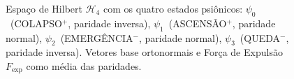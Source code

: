 \documentclass[12pt,a4paper]{article}
\newcommand{\Fexp}{F_{\text{exp}}}
\newcommand{\Hfour}{\mathcal{H}_4}
\begin{document}
\begin{figure}[H]
\caption{Espaço de Hilbert $\Hfour$ com os quatro estados
psiônicos: $\psi_0$~(COLAPSO$^+$, paridade inversa),
$\psi_1$~(ASCENSÃO$^+$, paridade normal),
$\psi_2$~(EMERGÊNCIA$^-$, paridade normal),
$\psi_3$~(QUEDA$^-$, paridade inversa). Vetores base
ortonormais e Força de Expulsão $\Fexp$ como média das
paridades.}
\label{fig:hilbert}
\end{figure}
\end{document}

